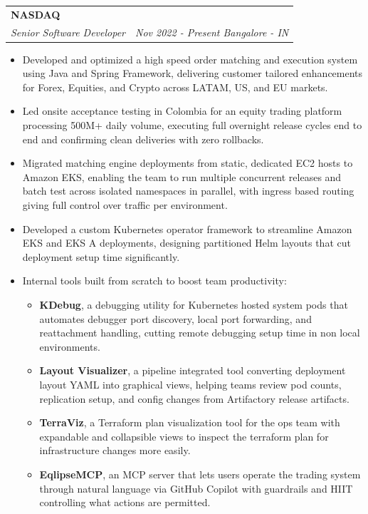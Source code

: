 \documentclass[a4paper,12pt]{article}
\makeatletter
\newcommand{\resumeSubheading}[4]{
  \vspace{1pt}\item
    \begin{tabular*}{\linewidth}[t]{l@{\extracolsep{\fill}}r}
      \textbf{#1} & \\
      \textit{#3} & \textit{#4 \textbar{} #2} \\
    \end{tabular*}\vspace{1pt}
}
\newcommand{\resumeItemListStart}{\begin{itemize}[leftmargin=0.15in, label={\small$\bullet$}]}
\newcommand{\resumeItemListEnd}{\end{itemize}\vspace{1pt}}
\makeatother
\begin{document}
    \resumeSubheading
      {NASDAQ}{Bangalore - IN}
      {Senior Software Developer}{Nov 2022 - Present}
      \resumeItemListStart
        \item Developed and optimized a high speed order matching and execution system using Java and Spring Framework, delivering customer tailored enhancements for Forex, Equities, and Crypto across LATAM, US, and EU markets.
        \item Led onsite acceptance testing in Colombia for an equity trading platform processing 500M+ daily volume, executing full overnight release cycles end to end and confirming clean deliveries with zero rollbacks.
        \item Migrated matching engine deployments from static, dedicated EC2 hosts to Amazon EKS, enabling the team to run multiple concurrent releases and batch test across isolated namespaces in parallel, with ingress based routing giving full control over traffic per environment.
        \item Developed a custom Kubernetes operator framework to streamline Amazon EKS and EKS A deployments, designing partitioned Helm layouts that cut deployment setup time significantly.
        \item Internal tools built from scratch to boost team productivity:
          \begin{itemize}[leftmargin=0.2in, label={$\circ$}]
            \item \textbf{KDebug}, a debugging utility for Kubernetes hosted system pods that automates debugger port discovery, local port forwarding, and reattachment handling, cutting remote debugging setup time in non local environments.
            \item \textbf{Layout Visualizer}, a pipeline integrated tool converting deployment layout YAML into graphical views, helping teams review pod counts, replication setup, and config changes from Artifactory release artifacts.
            \item \textbf{TerraViz}, a Terraform plan visualization tool for the ops team with expandable and collapsible views to inspect the terraform plan for infrastructure changes more easily.
            \item \textbf{EqlipseMCP}, an MCP server that lets users operate the trading system through natural language via GitHub Copilot with guardrails and HIIT controlling what actions are permitted.
          \end{itemize}
      \resumeItemListEnd
\end{document}

